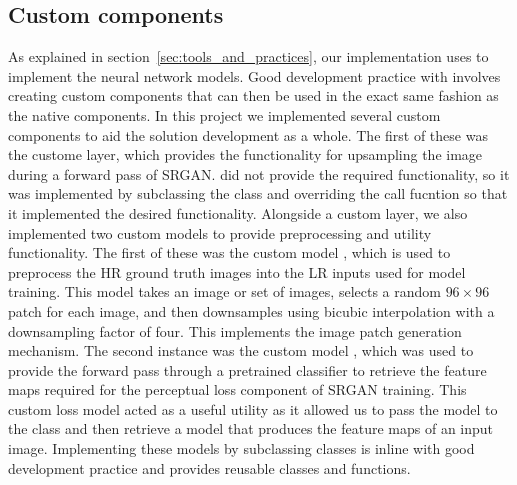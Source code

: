 \subsection{Custom  components}
As explained in section~\ref{sec:tools_and_practices}, our implementation uses  to implement the neural network models. Good development practice with  involves creating custom components that can then be used in the exact same fashion as the native  components. In this project we implemented several custom  components to aid the solution development as a whole. The first of these was the custome  layer, which provides the functionality for upsampling the image during a forward pass of SRGAN.\@{} did not provide the required functionality, so it was implemented by subclassing the  class and overriding the call fucntion so that it implemented the desired functionality. Alongside a custom layer, we also implemented two custom models to provide preprocessing and utility functionality. The first of these was the custom model , which is used to preprocess the HR ground truth images into the LR inputs used for model training. This model takes an image or set of images, selects a random $96 \times 96$ patch for each image, and then downsamples using bicubic interpolation with a downsampling factor of four. This implements the image patch generation mechanism. The second instance was the custom model , which was used to provide the forward pass through a pretrained classifier to retrieve the feature maps required for the perceptual loss component of SRGAN training. This custom loss model acted as a useful utility as it allowed us to pass the model to the class and then retrieve a model that produces the feature maps of an input image. Implementing these models by subclassing  classes is inline with good development practice and provides reusable classes and functions.

